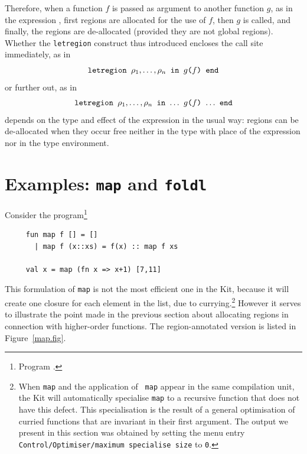 \documentclass[12pt]{book}
\begin{document}
Therefore, when a function $f$ is passed as argument to another
function $g$, as in the expression , first regions are
allocated for the use of $f$, then $g$ is called, and finally, the
regions are de-allocated (provided they are not global regions).
Whether the {\tt letregion} construct thus introduced encloses the
call site immediately, as in
$$\hbox{\tt letregion $\rho_1,\ldots,\rho_n$ in $g$($f$) end}$$
or further out, as in
$$\hbox{\tt letregion $\rho_1,\ldots,\rho_n$ in $\ldots$ $g$($f$)
  $\ldots$ end}$$
depends on the type and effect of the expression
 in the usual way: regions can be de-allocated when
they occur free neither in the type with place of the expression
nor in the type environment.

\section{Examples: {\tt map} and {\tt foldl}}
Consider the program\footnote{Program .}
\begin{verbatim}
     fun map f [] = []
       | map f (x::xs) = f(x) :: map f xs
    
     val x = map (fn x => x+1) [7,11]
\end{verbatim}
This formulation of {\tt map} is not the most efficient one in the
Kit, because it will create one closure for each element in the list,
due to currying.\footnote{When {\tt map} and the application of {\tt
    map} appear in the same compilation unit, the Kit will
  automatically specialise {\tt map} to a recursive function that does
  not have this defect. This specialisation is the result of a general
  optimisation of curried functions that are invariant in their first
  argument. The output we present in this section was obtained by
  setting the menu entry {\tt Control/Optimiser/maximum specialise
    size} to {\tt 0}.} However it serves to illustrate the point made
in the previous section about allocating regions in connection with
higher-order functions. The region-annotated version is listed in
Figure~\ref{map.fig}.
\end{document}
